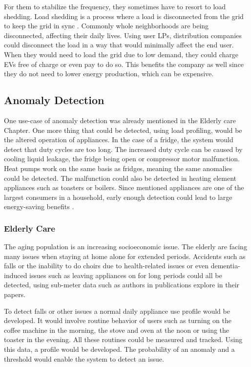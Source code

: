For them to stabilize the frequency, they sometimes have to resort to load shedding.
Load shedding is a process where a load is disconnected from the grid to keep the grid in sync \cite{loadShedding2006}.
Commonly whole neighborhoods are being disconnected, affecting their daily lives.
Using user LPs, distribution companies could disconnect the load in a way that would minimally affect the end user. 
When they would need to load the grid due to low demand, they could charge EVs free of charge or even pay to do so. 
This benefits the company as well since they do not need to lower energy production, which can be expensive. 

\subsection{Anomaly Detection}

One use-case of anomaly detection was already mentioned in the Elderly care Chapter.
One more thing that could be detected, using load profiling, would be the altered operation of appliances.
In the case of a fridge, the system would detect that duty cycles are too long.
The increased duty cycle can be caused by cooling liquid leakage, the fridge being open or compressor motor malfunction.
Heat pumps work on the same basis as fridges, meaning the same anomalies could be detected. 
The malfunction could also be detected in heating element appliances such as toasters or boilers. 
Since mentioned appliances are one of the largest consumers in a household,
early enough detection could lead to large energy-saving benefits \cite{NILMAD2019}.

\subsubsection{Elderly Care}

The aging population is an increasing socioeconomic issue.
The elderly are facing many issues when staying at home alone for extended periods.
Accidents such as falls or the inability to do choirs due to health-related issues or even dementia-induced issues 
such as leaving appliances on for long periods could all be detected, using sub-meter data such as authors in publications \cite{elder1} \cite{elder2}
explore in their papers.

To detect falls or other issues a normal daily appliance use profile would be developed.
It would involve routine behavior of users such as turning on the coffee machine in the morning, the stove and oven at the noon or using the toaster in the evening.
All these routines could be measured and tracked. Using this data, a profile would be developed.
The probability of an anomaly and a threshold would enable the system to detect an issue.

